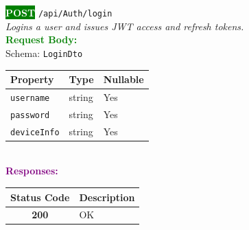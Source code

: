 \begin{tcolorbox}[
    colback=green!5,
    colframe=green,
    arc=2mm,
    boxrule=1pt,
    left=5pt,
    right=5pt,
    top=5pt,
    bottom=5pt
]
\noindent\colorbox{green}{\textcolor{white}{\textbf{POST}}} 
\texttt{\large /api/Auth/login}\\[0.3em]
\textit{Logins a user and issues JWT access and refresh tokens.}\\[0.3em]
\vspace{0.3em}
\textbf{\textcolor{green}{Request Body:}}\\[0.2em]
Schema: \texttt{LoginDto}\\[0.3em]
\begin{tabular}{|l|l|l|}
\hline
\rowcolor{green!10}
\textbf{Property} & \textbf{Type} & \textbf{Nullable} \\ \hline
\texttt{username} & string & Yes \\ \hline
\rowcolor{gray!5}
\texttt{password} & string & Yes \\ \hline
\texttt{deviceInfo} & string & Yes \\ \hline
\end{tabular}\\[0.5em]
\vspace{0.3em}
\textbf{\textcolor{purple}{Responses:}}\\[0.2em]
\begin{tabular}{|c|p{10cm}|}
\hline
\rowcolor{gray!20}
\textbf{Status Code} & \textbf{Description} \\ \hline
\colorbox{green!20}{\textbf{200}} & OK \\ \hline
\end{tabular}
\end{tcolorbox}
\vspace{0.5em}

